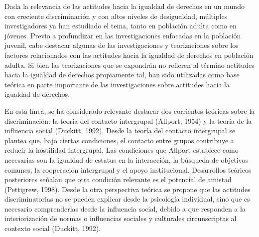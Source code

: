 \documentclass[12pt,twoside]{templates/facsothesis}
\begin{document}
Dada la relevancia de las actitudes hacia la igualdad de derechos en un mundo con creciente discriminación y con altos niveles de desigualdad, múltiples investigadores ya han estudiado el tema, tanto en población adulta como en jóvenes. Previo a profundizar en las investigaciones enfocadas en la población juvenil, cabe destacar algunas de las investigaciones y teorizaciones sobre los factores relacionados con las actitudes hacia la igualdad de derechos en población adulta. Si bien las teorizaciones que se expondrán no refieren al término actitudes hacia la igualdad de derechos propiamente tal, han sido utilizadas como base teórica en parte importante de las investigaciones sobre actitudes hacia la igualdad de derechos.

En esta línea, se ha considerado relevante destacar dos corrientes teóricas sobre la discriminación: la teoría del contacto intergrupal (Allport, 1954) y la teoría de la influencia social (Duckitt, 1992). Desde la teoría del contacto intergrupal se plantea que, bajo ciertas condiciones, el contacto entre grupos contribuye a reducir la hostilidad intergrupal. Las condiciones que Allport establece como necesarias son la igualdad de estatus en la interacción, la búsqueda de objetivos comunes, la cooperación intergrupal y el apoyo institucional. Desarrollos teóricos posteriores señalan que otra condición relevante es el potencial de amistad (Pettigrew, 1998). Desde la otra perspectiva teórica se propone que las actitudes discriminatorias no se pueden explicar desde la psicología individual, sino que es necesario comprenderlas desde la influencia social, debido a que responden a la interiorización de normas o influencias sociales y culturales circunscriptas al contexto social (Duckitt, 1992).
\end{document}
